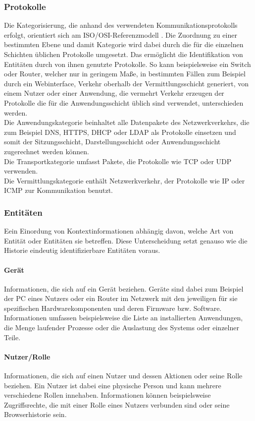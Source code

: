 \subsubsection{Protokolle}
Die Kategorisierung, die anhand des verwendeten Kommunikationsprotokolls erfolgt, orientiert sich am ISO/OSI-Referenzmodell \cite{day1983osi}. Die Zuordnung zu einer bestimmten Ebene und damit Kategorie wird dabei durch die für die einzelnen Schichten üblichen Protokolle umgesetzt. Das ermöglicht die Identifikation von Entitäten durch von ihnen genutzte Protokolle. So kann beispielsweise ein Switch oder Router, welcher nur in geringem Maße, in bestimmten Fällen zum Beispiel durch ein Webinterface, Verkehr oberhalb der Vermittlungsschicht generiert, von einem Nutzer oder einer Anwendung, die vermehrt Verkehr erzeugen der Protokolle die für die Anwendungsschicht üblich sind verwendet, unterschieden werden.\\Die Anwendungskategorie beinhaltet alle Datenpakete des Netzwerkverkehrs, die zum Beispiel DNS, HTTPS, DHCP oder LDAP als Protokolle einsetzen und somit der Sitzungsschicht, Darstellungsschicht oder Anwendungsschicht zugerechnet werden können.\\Die Transportkategorie umfasst Pakete, die Protokolle wie TCP oder UDP verwenden.\\Die Vermittlungskategorie enthält Netzwerkverkehr, der Protokolle wie IP oder ICMP zur Kommunikation benutzt.
\subsubsection{Entitäten}
Eein Einordung von Kontextinformationen abhängig davon, welche Art von Entität oder Entitäten sie betreffen. Diese Unterscheidung setzt genauso wie die Historie eindeutig identifizierbare Entitäten voraus.
\paragraph{Gerät}
Informationen, die sich auf ein Gerät beziehen. Geräte sind dabei zum Beispiel der PC eines Nutzers oder ein Router im Netzwerk mit den jeweiligen für sie spezifischen Hardwarekomponenten und deren Firmware bzw. Software. Informationen umfassen beispielsweise die Liste an installierten Anwendungen, die Menge laufender Prozesse oder die Auslastung des Systems oder einzelner Teile.
\paragraph{Nutzer/Rolle}
Informationen, die sich auf einen Nutzer und dessen Aktionen oder seine Rolle beziehen. Ein Nutzer ist dabei eine physische Person und kann mehrere verschiedene Rollen innehaben. Informationen können beispielsweise Zugriffsrechte, die mit einer Rolle eines Nutzers verbunden sind oder seine Browserhistorie sein.
